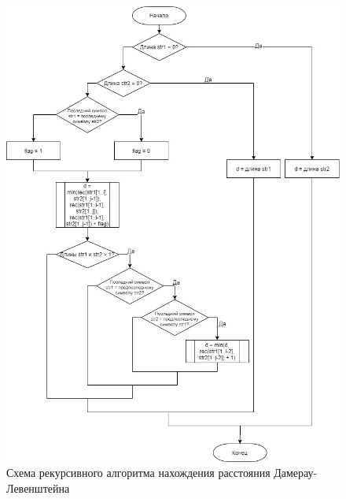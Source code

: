 \documentclass[12pt]{report}
\begin{document}
	\begin{figure}[h]
		\centering
		\includegraphics[scale=0.6]{rec_dl.jpg}
		\caption{Схема рекурсивного алгоритма нахождения расстояния Дамерау-Левенштейна}
		\label{fig:mpr}
	\end{figure}
	
\end{document}
